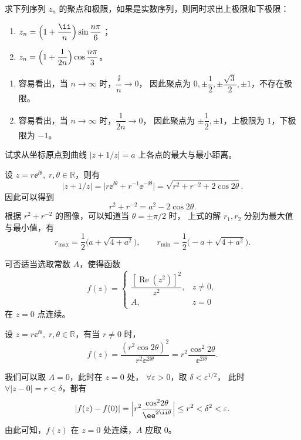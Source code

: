 \begin{question}
求下列序列 \(z_n\) 的聚点和极限，如果是实数序列，则同时求出上极限和下极限：
\begin{enumerate}
  \item \(\displaystyle z_n=\Bigl(1+\frac{\ii}{n}\Bigr)\sin\frac{n\pi}{6}\)；
  \item \(\displaystyle z_n=\Bigl(1+\frac{1}{2n}\Bigr)\cos\frac{n\pi}{3}\)。
\end{enumerate}
\begin{solution}
\begin{enumerate}
  \item 容易看出，当 \(n\to\infty\) 时，\(\dfrac{\ii}{n}\to0\)，
  因此聚点为 \(0,\pm\dfrac12,\pm\dfrac{\sqrt3}{2},\pm1\)，不存在极限。
  \item 容易看出，当 \(n\to\infty\) 时，\(\dfrac{1}{2n}\to0\)，
  因此聚点为 \(\pm\dfrac12,\pm1\)，上极限为 \(1\)，下极限为 \(-1\)。
\end{enumerate}
\end{solution}
\end{question}


\begin{question}
试求从坐标原点到曲线 \(|z+1/z|=a\) 上各点的最大与最小距离。
\begin{solution}
设 \(z=r\ee^{\ii\theta},\;r,\theta\in\mathbb{R}\)，则有
\[
\bigl|z+1/z\bigr|
=\bigl|r\ee^{\ii\theta}+r^{-1}\ee^{-\ii\theta}\bigr|
=\sqrt{r^2+r^{-2}+2\cos2\theta}.
\]
因此可以得到
\[
r^2+r^{-2}=a^2-2\cos2\theta.
\]
根据 \(r^2+r^{-2}\) 的图像，可以知道当 \(\theta=\pm\pi/2\) 时，
上式的解 \(r_1,r_2\) 分别为最大值与最小值，有
\[
r_{\max}=\frac12\bigl(a+\sqrt{4+a^2}\bigr),\qquad
r_{\min}=\frac12\bigl(-a+\sqrt{4+a^2}\bigr).
\]
\end{solution}
\end{question}


\begin{question}
可否适当选取常数 \(A\)，使得函数
\[
f(z)=\begin{cases}
\dfrac{[\operatorname{Re}(z^2)]^2}{z^2}, & z\neq0,\\[6pt]
A, & z=0
\end{cases}
\]
在 \(z=0\) 点连续。
\begin{solution}
设 \(z=r\ee^{\ii\theta},\;r,\theta\in\mathbb{R}\)，有当 \(r\neq0\) 时，
\[
f(z)=\frac{(r^2\cos2\theta)^2}{r^2\ee^{2\ii\theta}}
=r^2\frac{\cos^2\!2\theta}{\ee^{2\ii\theta}}.
\]

我们可以取 \(A=0\)，此时在 \(z=0\) 处，
\(\forall\varepsilon>0\)，取 \(\delta<\varepsilon^{1/2}\)，
此时 \(\forall|z-0|=r<\delta\)，都有
\[
|f(z)-f(0)|
=\Bigl|r^2\frac{\cos^2\!2\theta}{\ee^{2\ii\theta}}\Bigr|
\le r^2<\delta^2<\varepsilon.
\]
由此可知，\(f(z)\) 在 \(z=0\) 处连续，\(A\) 应取 \(0\)。
\end{solution}
\end{question}


